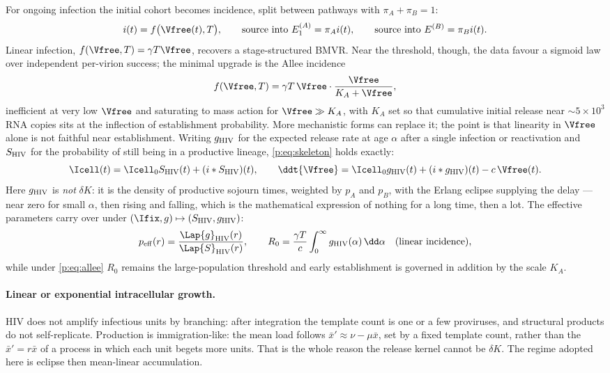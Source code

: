 For ongoing infection the initial cohort becomes incidence, split between
pathways with $\pi_A+\pi_B=1$:
\begin{equation}
i(t)=f\bigl(\Vfree(t),T\bigr),
\qquad
\text{source into }E_1^{(A)}=\pi_A i(t),
\qquad
\text{source into }E^{(B)}=\pi_B i(t).
\label{p:eq:hiv-incidence}
\end{equation}
Linear infection, $f(\Vfree,T)=\gamma T\Vfree$, recovers a stage-structured
BMVR. Near the threshold, though, the data favour a sigmoid law over
independent per-virion success; the minimal upgrade is the Allee incidence
\begin{equation}
f(\Vfree,T)=\gamma T\,\Vfree\cdot\frac{\Vfree}{K_A+\Vfree},
\label{p:eq:allee}
\end{equation}
inefficient at very low $\Vfree$ and saturating to mass action for
$\Vfree\gg K_A$, with $K_A$ set so that cumulative initial release near
$\sim5\times10^3$ RNA copies sits at the inflection of establishment
probability. More mechanistic forms can replace it; the point is that
linearity in $\Vfree$ alone is not faithful near establishment. Writing
$g_{\rm HIV}$ for the expected release rate at age $\alpha$ after a single
infection or reactivation and $S_{\rm HIV}$ for the probability of still
being in a productive lineage, \cref{p:eq:skeleton} holds exactly:
\begin{equation}
\Icell(t)=\Icell_0S_{\rm HIV}(t)+(i*S_{\rm HIV})(t),
\qquad
\ddt{\Vfree}=\Icell_0g_{\rm HIV}(t)+(i*g_{\rm HIV})(t)-c\,\Vfree(t).
\label{p:eq:hiv-renewal}
\end{equation}
Here $g_{\rm HIV}$ is \emph{not} $\delta K$: it is the density of productive
sojourn times, weighted by $p_A$ and $p_B$, with the Erlang eclipse supplying
the delay --- near zero for small $\alpha$, then rising and falling, which is
the mathematical expression of nothing for a long time, then a lot. The
effective parameters carry over under
$(\Ifix,g)\mapsto(S_{\rm HIV},g_{\rm HIV})$:
\begin{equation}
p_{\rm eff}(r)=\frac{\Lap{g}_{\rm HIV}(r)}{\Lap{S}_{\rm HIV}(r)},
\qquad
R_0=\frac{\gamma T}{c}\int_0^\infty g_{\rm HIV}(\alpha)\,\dd\alpha
\quad\text{(linear incidence)},
\label{p:eq:hiv-peff}
\end{equation}
while under \cref{p:eq:allee} $R_0$ remains the large-population threshold
and early establishment is governed in addition by the scale $K_A$.

\paragraph{Linear or exponential intracellular growth.} HIV does not
amplify infectious units by branching: after integration the template count
is one or a few proviruses, and structural products do not self-replicate.
Production is immigration-like: the mean load follows
$\bar x'\approx\nu-\mu\bar x$, set by a fixed template count, rather than
the $\bar x'=r\bar x$ of a process in which each unit begets more units.
That is the whole reason the release kernel cannot be $\delta K$. The regime
adopted here is eclipse then mean-linear accumulation.

